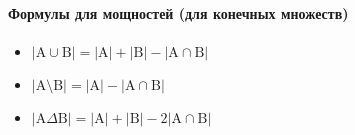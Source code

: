 \paragraph{Формулы для мощностей (для конечных множеств)}
\begin{itemize}
    \item $|\text{A} \cup \text{B}| = |\text{A}| + |\text{B}| - |\text{A} \cap \text{B}|$ 
    \item $|\text{A} \setminus \text{B}| = |\text{A}| - |\text{A} \cap \text{B}|$
    \item $|\text{A} \Delta \text{B}| = |\text{A}| + |\text{B}| - 2|\text{A} \cap \text{B}|$
\end{itemize}